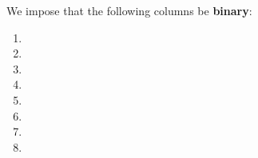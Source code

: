 We impose that the following columns be \textbf{binary}:
\begin{multicols}{2}
	\begin{enumerate}
		\item \isModexpBase
		\item \isModexpExponent
		\item \isModexpModulus
		\item \isModexpResult
		\item \isBlakeData
		\item \isBlakeParams
		\item \isBlakeResult
		\item[\vspace{\fill}]
	\end{enumerate} 
\end{multicols}

